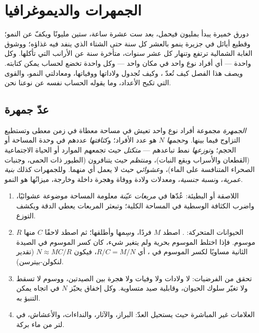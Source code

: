 \chapter{الجمهرات والديموغرافيا}\label{ch:b1:populations}

دورق خميرة يبدأ بمليون  فيحمل، بعد ست عشرة ساعة، ستين مليونًا
ويكفّ عن النمو؛ وقطيع أيائل في جزيرة ينمو بالعشر كل سنة حتى الشتاء
الذي ينفد فيه غذاؤه؛ ووشوق الغابة الشمالية ترتفع وتنهار كل عشر
سنوات، متأخرة سنة عن الأرانب التي تأكلها. وكل واحدة \emph{}
--- أي أفراد نوع واحد في مكان واحد --- وكل واحدة تخضع لحساب يمكن
كتابته. ويصف هذا الفصل كيف تُعدّ ، وكيف تُجدول ولاداتها
ووفياتها، ومعادلتي النمو، والقوى التي تكبح الأعداد، وما يقوله
الحساب نفسه عن نوعنا نحن.

\section{عدّ جمهرة}

\begin{definition}\label{def:b1:populations:population}
\emph{الجمهرة} مجموعة أفراد نوع واحد تعيش في مساحة معطاة في زمن
معطى وتستطيع التزاوج فيما بينها. و\emph{حجمها} $N$ هو عدد الأفراد؛
و\emph{كثافتها} عددهم في وحدة المساحة أو الحجم؛ و\emph{توزعها} نمط
تباعدهم --- \emph{متكتل} حيث تجمعهم الموارد أو الحياة الاجتماعية
(القطعان والأسراب وبقع النبات)، و\emph{منتظم} حيث يتنافرون (الطيور
ذات الحمى، وجنبات الصحراء المتنافسة على الماء)، و\emph{عشوائي} حيث
لا يعمل أي منهما. وللجمهرات كذلك \emph{بنية عمرية}، و\emph{نسبة
جنسية}، ومعدلات ولادة ووفاة وهجرة داخلة وخارجة، ميزانُها هو النمو.
\end{definition}

\begin{method}\label{met:b1:populations:counting}
\begin{enumerate}
  \item {} اللاصقة أو البطيئة: عُدّها في \emph{مربعات عيّنة}
        معلومة المساحة موضوعة عشوائيًا، واضرب الكثافة الوسطية في
        المساحة الكلية؛ وتبعثر المربعات يعطي الدقة ويكشف التوزع.
  \item الحيوانات المتحركة: \emph{}. اصطد $M$
        فردًا، وسِمها وأطلقها؛ ثم اصطد لاحقًا $C$ منها $R$ موسوم.
        فإذا اختلط الموسوم بحرية ولم يتغير شيء، كان كسر الموسوم في
        الصيدة الثانية مساويًا لكسر الموسوم في ، أي
        $R/C = M/N$، فيكون
        $N \approx MC/R$ (تقدير لنكولن-بيترسن).
  \item تحقق من الفرضيات: لا ولادات ولا وفيات ولا هجرة بين
        الصيدتين، ووسوم لا تسقط ولا تغيّر سلوك الحيوان، وقابلية صيد
        متساوية. وكل إخفاق يحيّز $N$ في اتجاه يمكن التنبؤ به.
  \item العلامات غير المباشرة حيث يستحيل العدّ: البراز، والآثار،
        والنداءات، والأعشاش،  في لتر من ماء بركة.
\end{enumerate}
\end{method}

